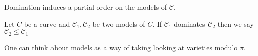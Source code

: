 Domination induces a partial order on the models of $\mathscr C$. 
\begin{definition}
	Let $C$ be a curve and $\mathscr C_1, \mathscr C_2$ be two models of $C$. 
	If $\mathscr C_1$ dominates $\mathscr C_2$ then we say $\mathscr C_2 \le \mathscr C_1$
\end{definition}


One can think about models as a way of taking looking at varieties modulo $\pi$. 






